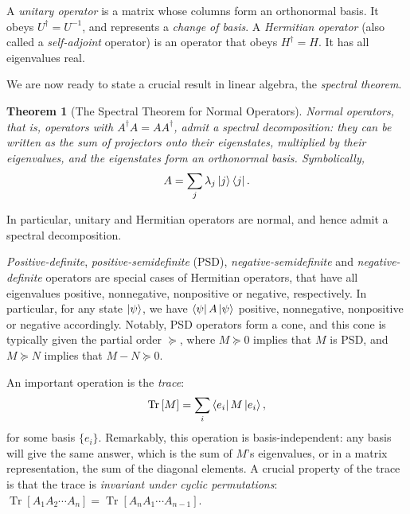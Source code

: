 \documentclass[10pt, a4paper]{article}
\numberwithin{equation}{section} %
\newcounter{stmt} %
\theoremstyle{definition}
\theoremstyle{plain}
\newtheorem{theorem}[stmt]{Theorem}
\newcommand{\?}{\mathrel{?}} %
\newcommand{\Tr}[2][]{\mathop{\mathrm{Tr}#1}\left[ #2 \right]} %
\begin{document}
\begin{appendices}
                          A \emph{unitary operator} is a matrix whose columns form an orthonormal basis. It obeys \(U^{\dagger} = U^{-1}\), and represents a \emph{change of basis}. A \emph{Hermitian operator} (also called a \emph{self-adjoint} operator) is an operator that obeys \(H^{\dagger} = H\). It has all eigenvalues real.

                          We are now ready to state a crucial result in linear algebra, the \emph{spectral theorem}.
                          \begin{theorem}[The Spectral Theorem for Normal Operators]
                            Normal operators, that is, operators with \(A^{\dagger}A = AA^{\dagger}\), admit a \emph{spectral decomposition}: they can be written as the sum of projectors onto their eigenstates, multiplied by their eigenvalues, and the eigenstates form an orthonormal basis. Symbolically,
                            \begin{equation}
                              A = \sum_j \lambda_j \ket{j}\bra{j}.
                            \end{equation}
                          \end{theorem}
                          In particular, unitary and Hermitian operators are normal, and hence admit a spectral decomposition.

                          \emph{Positive-definite}, \emph{positive-semidefinite} (PSD), \emph{negative-semidefinite} and \emph{negative-definite} operators are special cases of Hermitian operators, that have all eigenvalues positive, nonnegative, nonpositive or negative, respectively. In particular, for any state \(\ket{\psi}\), we have \(\bra{\psi}A\ket{\psi}\) positive, nonnegative, nonpositive or negative accordingly. Notably, PSD operators form a cone, and this cone is typically given the partial order \(\succeq\), where \(M \succeq 0\) implies that \(M\) is PSD, and \(M \succeq N\) implies that \(M-N \succeq 0\). 

                          An important operation is the \emph{trace}:
                          \begin{equation}
                            \Tr{M} = \sum_i \bra{e_i}M\ket{e_i},
                          \end{equation}
                          for some basis \(\{e_i\}\). Remarkably, this operation is basis-independent: any basis will give the same answer, which is the sum of \(M\)'s eigenvalues, or in a matrix representation, the sum of the diagonal elements. A crucial property of the trace is that the trace is \emph{invariant under cyclic permutations}: \(\Tr{A_1 A_2 \cdots A_n} = \Tr{A_n A_1 \cdots A_{n-1}}\).


\end{appendices}
\end{document}
